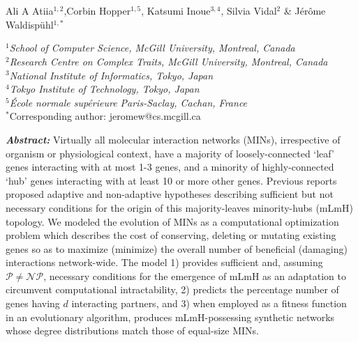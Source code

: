 


{}~\\~\\
\date{}

{\noindent\normalsize{\centering Ali A Atiia{\footnotesize$^{1,2}$},Corbin Hopper{\footnotesize$^{1,5}$}, Katsumi Inoue{\footnotesize$^{3,4}$}, Silvia Vidal{\footnotesize$^{2}$} \&  Jérôme Waldispühl{\footnotesize$^{1,*}$}}}

{\footnotesize
   \noindent$^1$\textit{School of Computer Science, McGill University, Montreal, Canada}~\\
   \noindent$^2$\textit{Research Centre on Complex Traits, McGill University, Montreal, Canada}~\\
   \noindent$^3$\textit{National Institute of Informatics, Tokyo, Japan}~\\
   \noindent$^4$\textit{Tokyo Institute of Technology, Tokyo, Japan}~\\
   \noindent$^5$\textit{École normale supérieure Paris-Saclay, Cachan, France}~\\
   \noindent$^*${Corresponding author: jeromew@cs.mcgill.ca}~\\
}


\vspace{25pt}
\noindent\textit{\textbf{Abstract:}} Virtually all molecular interaction networks (MINs), irrespective of organism or physiological context, have a majority of loosely-connected `leaf' genes interacting with at most 1-3 genes, and a minority of highly-connected `hub' genes interacting with at least 10 or more other genes.
    Previous reports proposed adaptive and non-adaptive hypotheses describing sufficient but not necessary conditions for the origin of this majority-leaves minority-hubs (mLmH) topology.
    We modeled the evolution of MINs as a computational optimization problem which describes the cost of conserving, deleting or mutating existing genes so as to maximize (minimize) the overall number of beneficial (damaging) interactions network-wide.
    The model 1) provides sufficient and, assuming $\mathcal{P}\neq \mathcal{NP}$, necessary conditions for the emergence of mLmH as an adaptation to circumvent computational intractability, 2) predicts the percentage number of genes having $d$ interacting partners, and 3) when employed as a fitness function in an evolutionary algorithm, produces mLmH-possessing synthetic networks whose degree distributions match those of equal-size MINs.

